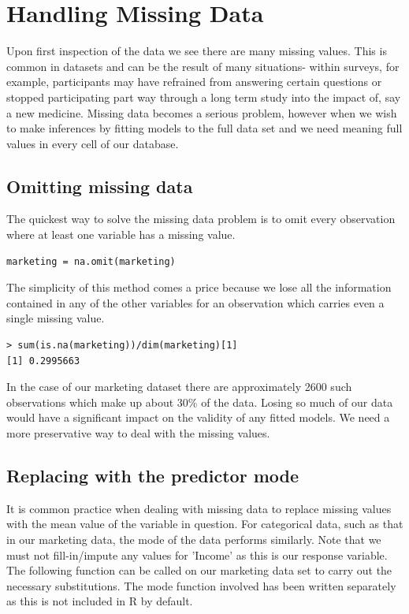 \documentclass{article}
\begin{document}
\section{Handling Missing Data}

\label{handling}
Upon first inspection of the data we see there are many missing values. This is common in datasets and can be the result of many situations- within surveys, for example, participants may have refrained from answering certain questions or stopped participating part way through a long term study into the impact of, say a new medicine. 
Missing data becomes a serious problem, however when we wish to make inferences by fitting models to the full data set and we need meaning full values in every cell of our database. 

\subsection{Omitting missing data}
The quickest way to solve the missing data problem is to omit every observation where at least one variable has a missing value.  

\begin{verbatim}  
marketing = na.omit(marketing)  
\end{verbatim}
The simplicity of this method comes a price because we lose all the information contained in any of the other variables for an observation which carries even a single missing value.


\begin{verbatim}
> sum(is.na(marketing))/dim(marketing)[1]
[1] 0.2995663
\end{verbatim}
In the case of our marketing dataset there are approximately 2600 such observations which make up about 30\% of the data. Losing so much of our data would have a significant impact on the validity of any fitted models. We need a more preservative way to deal with the missing values.

\subsection{Replacing with the predictor mode}
It is common practice when dealing with missing data to replace missing values with the mean value of the variable in question. For categorical data, such as that in our marketing data, the mode of the data performs similarly. Note that we must not fill-in/impute any values for 'Income' as this is our response variable.
The following function can be called on our marketing data set to carry out the necessary substitutions. The mode function involved has been written separately as this is not included in R by default.
\end{document}
